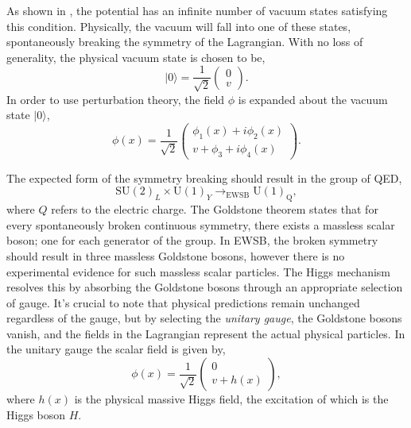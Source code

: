 As shown in , the potential has an infinite number of vacuum states satisfying this condition.
Physically, the vacuum will fall into one of these states, spontaneously breaking the symmetry of the Lagrangian.
With no loss of generality, the physical vacuum state is chosen to be,
\begin{equation}
	\label{eq:higgs_vacuum}
	| 0 \rangle	= \frac{1}{\sqrt{2}} \begin{pmatrix} 0 \\ v \end{pmatrix}.
\end{equation}
In order to use perturbation theory, the field $\phi$ is expanded about the vacuum state $|0\rangle$,
\begin{equation}
	\phi(x) = \frac{1}{\sqrt{2}} \begin{pmatrix} \phi_1(x) + i \phi_2(x) \\ v + \phi_3 + i \phi_4(x) \end{pmatrix}.
\end{equation}

The expected form of the symmetry breaking should result in the group of QED,
\begin{equation}
	\text{SU}(2)_L \times \text{U}(1)_Y \rightarrow_\text{EWSB} \text{U}(1)_\text{Q},
\end{equation}
where $Q$ refers to the electric charge.
The Goldstone theorem states that for every spontaneously broken continuous symmetry, there exists a massless scalar boson; one for each generator of the group.
In EWSB, the broken symmetry should result in three massless Goldstone bosons, however there is no experimental evidence for such massless scalar particles.
The Higgs mechanism resolves this by absorbing the Goldstone bosons through an appropriate selection of gauge.
It's crucial to note that physical predictions remain unchanged regardless of the gauge, but by selecting the \textit{unitary gauge}, the Goldstone bosons vanish, and the fields in the Lagrangian represent the actual physical particles.
In the unitary gauge the scalar field is given by,
\begin{equation}
	\label{eq:higgs_unitary_gauge}
	\phi(x) = \frac{1}{\sqrt{2}} \begin{pmatrix} 0 \\ v + h(x) \end{pmatrix},
\end{equation}
where $h(x)$ is the physical massive Higgs field, the excitation of which is the Higgs boson $H$.

